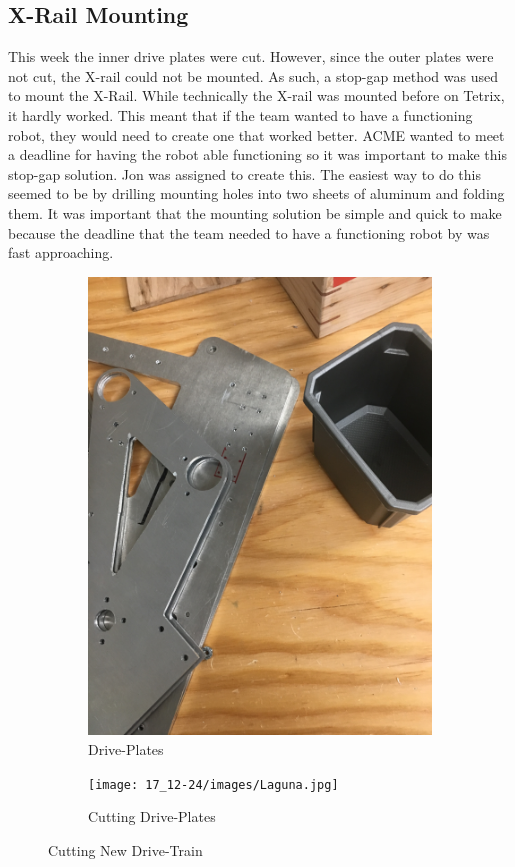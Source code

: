 \documentclass{article}
\begin{document}
\subsection{X-Rail Mounting}
This week the inner drive plates were cut. However, since the outer plates were not cut, the X-rail could not be mounted. As such, a stop-gap method was used to mount the X-Rail. While technically the X-rail was mounted before on Tetrix, it hardly worked. This meant that if the team wanted to have a functioning robot, they would need to create one that worked better. ACME wanted to meet a deadline for having the robot able functioning so it was important to make this stop-gap solution. Jon was assigned to create this. The easiest way to do this seemed to be by drilling mounting holes into two sheets of aluminum and folding them. It was important that the mounting solution be simple and quick to make because the deadline that the team needed to have a functioning robot by was fast approaching. 

\begin{figure}[h!]
\centering
\begin{subfigure}{.5\textwidth}
  \centering
  \includegraphics[width=\textwidth,angle=-90]{17_12-24/images/DrivePlates.JPG}
  \caption{Drive-Plates}
  \label{fig:Plates}
 \end{subfigure}
\begin{subfigure}{.45\textwidth}
  \centering
  \texttt{[image: 17\_12-24/images/Laguna.jpg]}
  \caption{Cutting Drive-Plates}
  \label{fig:Cutting}
  \end{subfigure}
  \caption{Cutting New Drive-Train}
  \end{figure}
\end{document}
